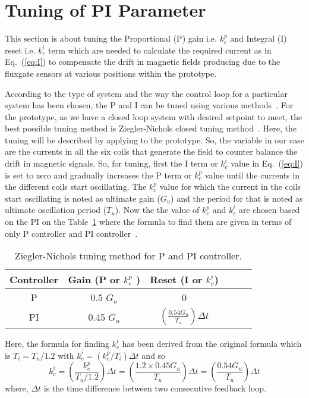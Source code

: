 \section{Tuning of PI Parameter}\label{sec:tune}
This section is about tuning the Proportional (P) gain i.e. $k_c^p$ and Integral (I) reset i.e. $k_c^i$ term which are needed to calculate the required current as in Eq.~(\ref{eq:I}) to compensate the drift in magnetic fields producing due to the fluxgate sensors at various positions within the prototype.



According to the type of system and the way the control loop for a particular system has been chosen, the P and I can be tuned using various methods~\cite{tuning}. For the prototype, as we have a closed loop system with desired setpoint to meet, the best possible tuning method is Ziegler-Nichols closed tuning method~\cite{tuning_ZN}. Here, the tuning will be described by applying to the prototype. So, the variable in our case are the currents in all the six coils that generate the field to counter balance the drift in magnetic signals. So, for tuning, first the I term or $k_c^i$ value in Eq.~(\ref{eq:I}) is set to zero and gradually increases the P term or $k_c^p$ value until the currents in the different coils start oscillating. The $k_c^p$ value for which the current in the coils start oscillating is noted as ultimate gain ($G_{u}$) and the period for that is noted as ultimate oscillation period ($T_u$). Now the the value of $k_c^p$ and $k_c^i$ are chosen based on the PI on the Table~\ref{table:tuning} where the formula to find them are given in terms of only P controller and PI controller~\cite{tuning_formula}. 

\begin{table} [htb!]
    \centering
    \begin{tabular} { |c|c|c|c|c|c|} 
        \hline
        Controller & Gain (P or $k_c^p$ ) & Reset (I or $k_c^i$)\\
        \hline\hline
         P & 0.5 $G_u$ & 0 \\ 
        \hline
         PI & 0.45 $G_u$ & $\left(\frac{\text{0.54} G_u}{T_u}\right)\Delta t$ \\ 
        \hline
    \end{tabular}
    \caption{Ziegler-Nichols tuning method for P and PI controller. }\label{table:tuning}
\end{table}

\FloatBarrier
Here, the formula for finding $k_c^i$ has been derived from the original formula which is $T_i=T_u/1.2$ with $k_c^i=(k_c^p/T_i)\Delta t$ and so
\begin{equation}
    k_c^i=\left(\frac{k_c^p}{T_u/1.2}\right)\Delta t=\left(\frac{1.2\times0.45 G_u}{T_u}\right)\Delta t=\left(\frac{0.54 G_u}{T_u}\right)\Delta t
\end{equation}
where, $\Delta t$ is the time difference between two consecutive feedback loop.

